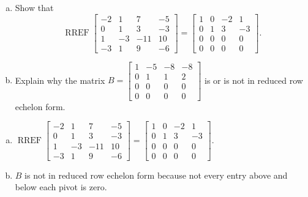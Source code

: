 
\begin{exerciseStatement}

\begin{enumerate}[(a)]
\item Show that \[\operatorname{RREF} \left[\begin{array}{cccc}
-2 & 1 & 7 & -5 \\
0 & 1 & 3 & -3 \\
1 & -3 & -11 & 10 \\
-3 & 1 & 9 & -6
\end{array}\right] = \left[\begin{array}{cccc}
1 & 0 & -2 & 1 \\
0 & 1 & 3 & -3 \\
0 & 0 & 0 & 0 \\
0 & 0 & 0 & 0
\end{array}\right] .\]
\item Explain why the matrix \(B= \left[\begin{array}{cccc}
1 & -5 & -8 & -8 \\
0 & 1 & 1 & 2 \\
0 & 0 & 0 & 0 \\
0 & 0 & 0 & 0
\end{array}\right] \) is or is not in reduced row echelon form.
\end{enumerate}
    
\end{exerciseStatement}
    
\begin{exerciseAnswer} 

\begin{enumerate}[(a)]
\item \(\operatorname{RREF} \left[\begin{array}{cccc}
-2 & 1 & 7 & -5 \\
0 & 1 & 3 & -3 \\
1 & -3 & -11 & 10 \\
-3 & 1 & 9 & -6
\end{array}\right] = \left[\begin{array}{cccc}
1 & 0 & -2 & 1 \\
0 & 1 & 3 & -3 \\
0 & 0 & 0 & 0 \\
0 & 0 & 0 & 0
\end{array}\right] .\)
\item \(B\) is not in reduced row echelon form because not every entry above and below each pivot is zero. 
\end{enumerate}
    
\end{exerciseAnswer}
    
